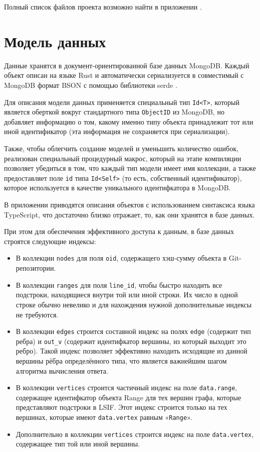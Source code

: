 Полный список файлов проекта возможно найти в приложении .

\section{Модель данных}
\label{section:data-model}

Данные хранятся в документ-ориентированной базе данных MongoDB. Каждый объект описан на языке Rust и автоматически сериализуется в совместимый с MongoDB формат BSON с помощью библиотеки serde \cite{serde-rs}. 

Для описания модели данных применяется специальный тип \texttt{Id<T>}, который является оберткой вокруг стандартного типа \texttt{ObjectID} из MongoDB, но добавляет информацию о том, какому именно типу объекта принадлежит тот или иной идентификатор (эта информация не сохраняется при сериализации).

Также, чтобы облегчить создание моделей и уменьшить количество ошибок, реализован специальный процедурный макрос, который на этапе компиляции позволяет убедиться в том, что каждый тип модели имеет имя коллекции, а также предоставляет поле \texttt{id} типа \texttt{Id<Self>} (то есть, собственный идентификатор), которое используется в качестве уникального идентифкатора в MongoDB.

В приложении  приводятся описания объектов с использованием синтаксиса языка TypeScript, что достаточно близко отражает, то, как они хранятся в базе данных.

При этом для обеспечения эффективного доступа к данным, в базе данных строятся следующие индексы:

\begin{itemize}
    \item В коллекции \texttt{nodes} для поля \texttt{oid}, содержащего хэш-сумму объекта в Git-репозитории.
    \item В коллекции \texttt{ranges} для поля \texttt{line\_id}, чтобы быстро находить все подстроки, находящиеся внутри той или иной строки. Их число в одной строке обычно невелико и для нахождения нужной дополнительные индексы не требуются.
    \item В коллекции \texttt{edges} строится составной индекс на полях \texttt{edge} (содержит тип ребра) и \texttt{out\_v} (содержит идентифкатор вершины, из который выходит это ребро). Такой индекс позволяет эффективно находить исходящие из данной вершины рёбра определённого типа, что является важнейшим шагом алгоритма вычисления ответа.
    \item В коллекции \texttt{vertices} строится частичный индекс на поле \texttt{data.range}, содержащее идентифкатор объекта Range для тех вершин графа, которые представляют подстроки в LSIF. Этот индекс строится только на тех вершинах, которые имеют \texttt{data.vertex} равным «\texttt{Range}».
    \item Дополнительно в коллекции \texttt{vertices} строится индекс на поле \texttt{data.vertex}, содержащее тип той или иной вершины.
\end{itemize}

